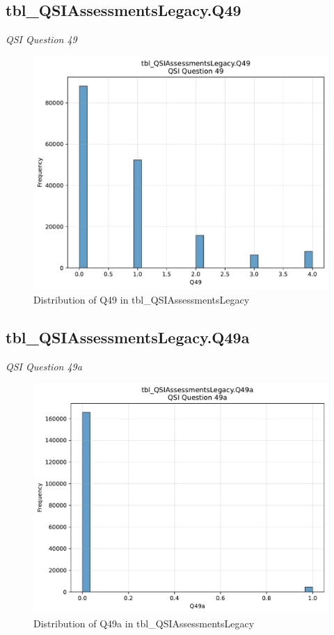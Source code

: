 \subsection{tbl\_QSIAssessmentsLegacy.Q49}
\textit{QSI Question 49}

\begin{figure}[htbp]
\centering
\includegraphics[width=\textwidth]{figures/dbo_tbl_QSIAssessmentsLegacy_Q49.pdf}
\caption{Distribution of Q49 in tbl\_QSIAssessmentsLegacy}
\end{figure}\newpage

\subsection{tbl\_QSIAssessmentsLegacy.Q49a}
\textit{QSI Question 49a}

\begin{figure}[htbp]
\centering
\includegraphics[width=\textwidth]{figures/dbo_tbl_QSIAssessmentsLegacy_Q49a.pdf}
\caption{Distribution of Q49a in tbl\_QSIAssessmentsLegacy}
\end{figure}\newpage

